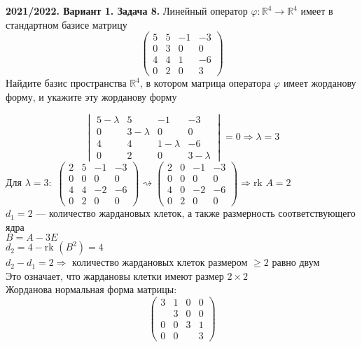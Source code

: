 \documentclass[a4paper]{article}
\newcommand{\rk}{\text{rk }}
\begin{document}
\begin{tcolorbox}[colback=blue!20!white, colframe=black!100!black]
    \textbf{2021/2022. Вариант 1. Задача 8.} Линейный оператор $\varphi:\mathbb{R}^4\rightarrow\mathbb{R}^4$ имеет в стандартном базисе матрицу 
    \begin{equation*}
    \begin{pmatrix}
        5&5&-1&-3\\
        0&3&0&0\\
        4&4&1&-6\\
        0&2&0&3
    \end{pmatrix}
    \end{equation*}
    Найдите базис пространства $\mathbb{R}^4$, в котором матрица оператора $\varphi$ имеет жорданову форму, и укажите эту жорданову форму
\end{tcolorbox}
\begin{equation*}
    \begin{vmatrix}
        5-\lambda&5&-1&-3\\
        0&3-\lambda&0&0\\
        4&4&1-\lambda&-6\\
        0&2&0&3-\lambda
    \end{vmatrix}=0\Longrightarrow \lambda=3
\end{equation*}
$\boxed{\text{Для }\lambda=3:}$ $\begin{pmatrix}
    2&5&-1&-3\\
    0&0&0&0\\
    4&4&-2&-6\\
    0&2&0&0
\end{pmatrix}\rightsquigarrow\begin{pmatrix}
    2&0&-1&-3\\
    0&0&0&0\\
    4&0&-2&-6\\
    0&2&0&0
\end{pmatrix}\Longrightarrow\rk{A}=2$\\[2mm]
$d_1=2$ — количество жардановых клеток, а также размерность соответствующего ядра\\[2mm]
$B=A-3E$\\[2mm]
$d_2=4-\rk{(B^2)}=4$\\[2mm]
$d_2-d_1=2\Longrightarrow$ количество жардановых клеток размером $\geqslant2$ равно двум\\[2mm]
Это означает, что жардановы клетки имеют размер $2\times2$\\[2mm]
Жорданова нормальная форма матрицы:
$$\left(
\begin{array}{cc|cc}
3 & 1 & 0 & 0 \\
 &  3 & 0 & 0 \\
\hline
0 & 0  & 3 & 1\\
0 & 0  &  & 3
\end{array}
\right)$$
\end{document}
